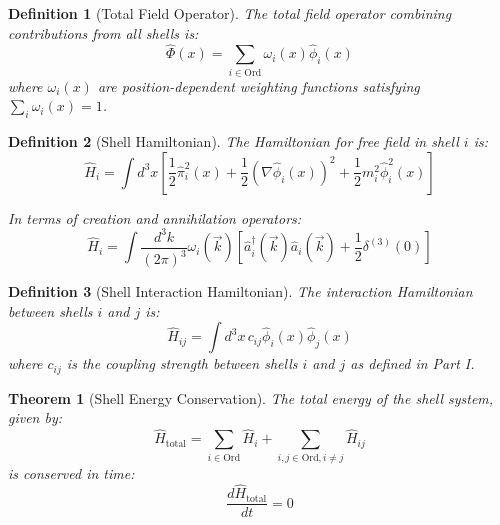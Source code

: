 \documentclass[12pt,a4paper]{article}
\newtheorem{theorem}{Theorem}[section]
\newtheorem{definition}{Definition}[section]
\begin{document}
\begin{definition}[Total Field Operator]
\label{def:total-field}
The total field operator combining contributions from all shells is:
\begin{equation}
\hat{\Phi}(x) = \sum_{i \in \text{Ord}} \omega_i(x) \hat{\phi}_i(x)
\end{equation}
where $\omega_i(x)$ are position-dependent weighting functions satisfying $\sum_i \omega_i(x) = 1$.
\end{definition}

\begin{definition}[Shell Hamiltonian]
\label{def:shell-hamiltonian}
The Hamiltonian for free field in shell $i$ is:
\begin{equation}
\hat{H}_i = \int d^3x \left[ \frac{1}{2}\hat{\pi}_i^2(x) + \frac{1}{2}(\nabla\hat{\phi}_i(x))^2 + \frac{1}{2}m_i^2\hat{\phi}_i^2(x) \right]
\end{equation}

In terms of creation and annihilation operators:
\begin{equation}
\hat{H}_i = \int \frac{d^3k}{(2\pi)^3} \omega_i(\vec{k}) \left[\hat{a}_i^{\dagger}(\vec{k})\hat{a}_i(\vec{k}) + \frac{1}{2}\delta^{(3)}(0)\right]
\end{equation}
\end{definition}

\begin{definition}[Shell Interaction Hamiltonian]
\label{def:interaction-hamiltonian}
The interaction Hamiltonian between shells $i$ and $j$ is:
\begin{equation}
\hat{H}_{ij} = \int d^3x \, c_{ij} \hat{\phi}_i(x) \hat{\phi}_j(x)
\end{equation}
where $c_{ij}$ is the coupling strength between shells $i$ and $j$ as defined in Part I.
\end{definition}

\begin{theorem}[Shell Energy Conservation]
\label{thm:energy-conservation}
The total energy of the shell system, given by:
\begin{equation}
\hat{H}_{\text{total}} = \sum_{i \in \text{Ord}} \hat{H}_i + \sum_{i,j \in \text{Ord}, i \neq j} \hat{H}_{ij}
\end{equation}
is conserved in time:
\begin{equation}
\frac{d\hat{H}_{\text{total}}}{dt} = 0
\end{equation}
\end{theorem}
\end{document}
